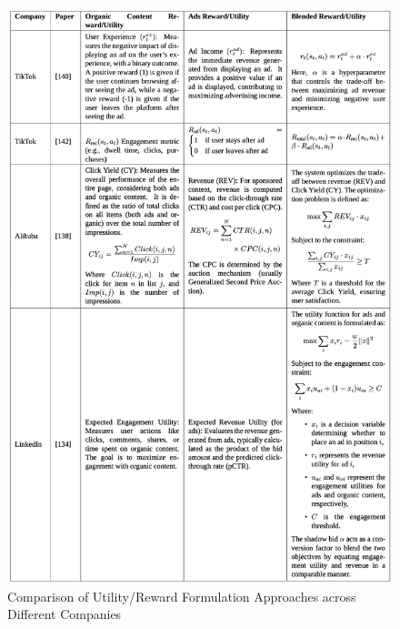 \documentclass[final]{anthology-ch}         %
\begin{document}
\begin{figure}[ht]
\centering
\includegraphics[width=\textwidth, height=0.85\textheight, keepaspectratio]{utility-comparison-table.png}
\caption{Comparison of Utility/Reward Formulation Approaches across Different Companies}
\label{fig:utility-comparison}
\end{figure}
\end{document}
